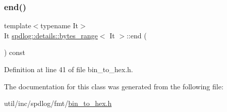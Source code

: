 \subsubsection{\texorpdfstring{end()}{end()}}
{\footnotesize\ttfamily template$<$typename It$>$ \\
It \hyperlink{classspdlog_1_1details_1_1bytes__range}{spdlog\+::details\+::bytes\+\_\+range}$<$ It $>$\+::end (\begin{DoxyParamCaption}{ }\end{DoxyParamCaption}) const\hspace{0.3cm}{\ttfamily [inline]}}



Definition at line 41 of file bin\+\_\+to\+\_\+hex.\+h.



The documentation for this class was generated from the following file\+:\begin{DoxyCompactItemize}
\item 
util/inc/spdlog/fmt/\hyperlink{bin__to__hex_8h}{bin\+\_\+to\+\_\+hex.\+h}\end{DoxyCompactItemize}
